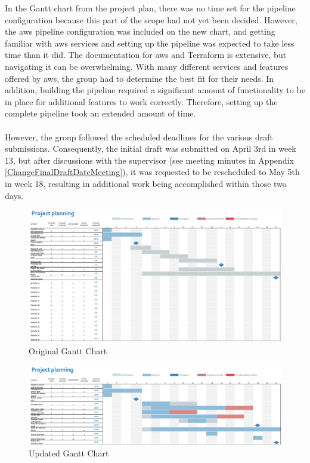 In the Gantt chart from the project plan, there was no time set for the pipeline configuration because this part of the scope had not yet been decided. However, the \acrshort{aws} pipeline configuration was included on the new chart, and getting familiar with \acrshort{aws} services and setting up the pipeline was expected to take less time than it did. The documentation for \acrshort{aws} and Terraform is extensive, but navigating it can be overwhelming. With many different services and features offered by \acrshort{aws}, the group had to determine the best fit for their needs. In addition, building the pipeline required a significant amount of functionality to be in place for additional features to work correctly. Therefore, setting up the complete pipeline took an extended amount of time. 
\\~\\
However, the group followed the scheduled deadlines for the various draft submissions. Consequently, the initial draft was submitted on April 3rd in week 13, but after discussions with the supervisor (see meeting minutes in Appendix \ref{ChangeFinalDraftDateMeeting}), it was requested to be rescheduled to May 5th in week 18, resulting in additional work being accomplished within those two days.

\vspace{2mm}
\begin{figure}[H]
    \centering
    \includegraphics[width=1\columnwidth]{Images/gantt2.jpg}
    \caption{Original Gantt Chart}
    \label{fig: Original Gantt Chart}
\end{figure}

\vspace{2mm}
\begin{figure}[H]
    \centering
    \includegraphics[width=1\columnwidth]{Images/finished-gantt.png}
    \caption{Updated Gantt Chart}
    \label{fig: Updated Gantt Chart}
\end{figure}


